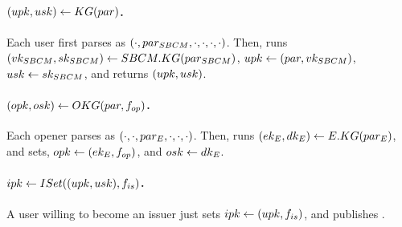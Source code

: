 \paragraph{$(upk,usk) \gets KG(par)$.} %
Each user first parses \parm as $(\cdot,par_{SBCM},\cdot,\cdot,\cdot,\cdot)$.
Then, runs $(vk_{SBCM},sk_{SBCM}) \gets SBCM.KG(par_{SBCM})$, $upk \gets (par,
vk_{SBCM})$, $usk \gets sk_{SBCM}$, and returns $(upk,usk)$.

\paragraph{$(opk,osk) \gets OKG(par,f_{op})$.} %
Each opener parses \parm as $(\cdot,\cdot,par_{E},\cdot,\cdot,\cdot)$.
Then, runs $(ek_{E},dk_{E}) \gets E.KG(par_{E})$, and sets, $opk \gets (ek_{E},
f_{op})$, and $osk \gets dk_{E}$.

\paragraph{$ipk \gets ISet((upk,usk),f_{is})$.} %
A user willing to become an issuer just sets $ipk \gets (upk,f_{is})$, and
publishes \ipk.

